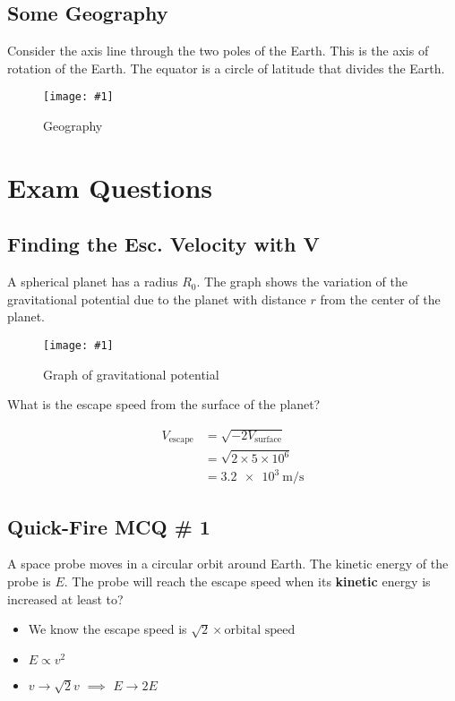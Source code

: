 \documentclass[a4paper,12pt]{article}
\let\oldsection\section
\renewcommand\section{\clearpage\oldsection}
\newcommand{\img}[4]{\begin{center}
  \begin{figure}[H]
    \centering
    \texttt{[image: \#1]}
    \caption{#3}
    \label{fig:#4}
  \end{figure}
\end{center}}
\begin{document}
\subsection{Some Geography}

Consider the axis line through the two poles of the Earth. This is the axis of rotation of the Earth. The equator is a circle of latitude that divides the Earth.

\img{equator.png}{0.4}{Geography}{equator}

\pagebreak

\section{Exam Questions}

\subsection{Finding the Esc. Velocity with V}

A spherical planet has a radius $R_0$.
The graph shows the variation of the gravitational potential due to the planet with distance $r$ from the center of the planet.
\img{ex/1.png}{0.8}{Graph of gravitational potential}{ex1}
What is the escape speed from the surface of the planet?

\begin{align*}
  V_{\text{escape}} & = \sqrt{-2V_{\text{surface}}}   \\
                    & = \sqrt{2 \times 5 \times 10^6} \\
                    & = \SI{3.2e3}{\meter\per\second}
\end{align*}

\pagebreak

\subsection{Quick-Fire MCQ \# 1}

A space probe moves in a circular orbit around Earth. The kinetic energy of the probe is $E$. The probe will reach the escape speed when its \textbf{kinetic} energy is increased at least to?
\begin{itemize}
  \item We know the escape speed is $\sqrt{2}\times\text{orbital speed}$
  \item $E \propto v^2$
  \item $v\to \sqrt{2}v$ $\implies$ $E\to 2E$
\end{itemize}
\end{document}
